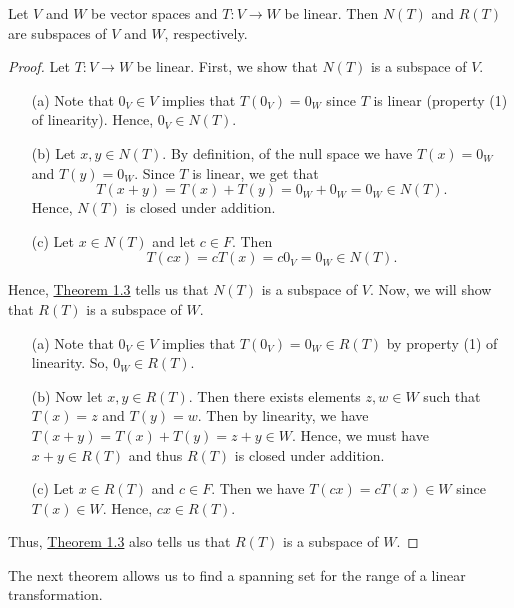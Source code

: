 \begin{theorem}[ ]
    Let \( V  \) and \( W  \) be vector spaces and \( T: V \to W  \) be linear. Then \( N(T) \) and \( R(T) \) are subspaces of \( V  \) and \( W  \), respectively.
\end{theorem}
\begin{proof}
    Let \( T: V \to W   \) be linear. First, we show that \( N(T) \) is a subspace of \( V  \). 
    \begin{enumerate}
        \item[(a)] Note that \( 0_{V} \in V  \) implies that \( T(0_{V}) = 0_{W}  \) since \( T  \) is linear (property (1) of linearity). Hence, \( 0_{V} \in N(T)  \).
        \item[(b)] Let \( x, y \in N(T) \). By definition, of the null space we have \( T(x) = 0_{W}  \) and \( T(y) = 0_{W} \). Since \( T  \) is linear, we get that
            \[  T(x+y) = T(x) + T(y) = 0_{W} + 0_{W} = 0_{W} \in N(T). \]
        Hence, \( N(T) \) is closed under addition.
        \item[(c)] Let \( x \in N(T)  \) and let \( c \in F  \). Then 
            \[ T(cx) = cT(x) = c 0_{V} = 0_{W} \in N(T).  \]
    \end{enumerate}
    Hence, {\hyperref[Subspaces]{Theorem 1.3}} tells us that \( N(T) \) is a subspace of \( V  \).
    Now, we will show that \( R(T) \) is a subspace of \( W  \).
    \begin{enumerate}
        \item[(a)] Note that \( 0_{V} \in V  \) implies that \( T(0_{V}) = 0_{W} \in R(T) \) by property (1) of linearity. So, \( 0_{W} \in R(T) \).
        \item[(b)] Now let \( x,y \in R(T)  \). Then there exists elements \( z, w \in W   \) such that \( T(x) = z  \) and \( T(y) = w  \). Then by linearity, we have \( T(x+y) = T(x) + T(y) = z + y \in W   \). Hence, we must have \( x + y \in R(T) \) and thus \( R(T)  \) is closed under addition.
        \item[(c)] Let \( x \in R(T)  \) and \( c \in F \). Then we have \( T(cx) = c T(x) \in W  \) since \( T(x) \in W  \). Hence, \( cx \in R(T) \).
    \end{enumerate}
    Thus, {\hyperref[Subspaces]{Theorem 1.3}} also tells us that \( R(T)  \) is a subspace of \( W  \).
\end{proof}

The next theorem allows us to find a spanning set for the range of a linear transformation.

